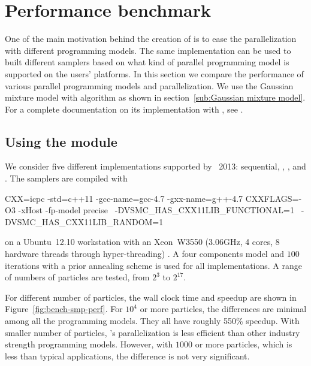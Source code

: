 \section{Performance benchmark}
\label{sec:Performance benchmark}

One of the main motivation behind the creation of \vsmc is to ease the
parallelization with different programming models. The same implementation can
be used to built different samplers based on what kind of parallel programming
model is supported on the users' platforms. In this section we compare the
performance of various \smp parallel programming models and \opencl
parallelization. We use the Gaussian mixture model with \smc[2] algorithm as
shown in section~\ref{sub:Gaussian mixture model}. For a complete
documentation on its implementation with \vsmc, see \cite{software:VSMC}.

\subsection{Using the \protect\smp module}
\label{sub:Using the SMP module}

We consider five different implementations supported by \icpc~2013:
sequential, \tbb, \cilk, \openmp and \cppoo{} . The
samplers are compiled with
\begin{makecode}
CXX=icpc -std=c++11 -gcc-name=gcc-4.7 -gxx-name=g++-4.7
CXXFLAGS=-O3 -xHost -fp-model precise  \
         -DVSMC_HAS_CXX11LIB_FUNCTIONAL=1  \
         -DVSMC_HAS_CXX11LIB_RANDOM=1
\end{makecode}
on a Ubuntu~12.10 workstation with an Xeon~W3550 (3.06GHz, 4 cores, 8 hardware
threads through hyper-threading) \cpu. A four components model and $100$
iterations with a prior annealing scheme is used for all implementations. A
range of numbers of particles are tested, from $2^3$ to $2^{17}$.

For different number of particles, the wall clock time and speedup are shown
in Figure~\ref{fig:bench-smp-perf}. For $10^4$ or more particles, the
differences are minimal among all the programming models. They all have
roughly 550\% speedup. With smaller number of particles, \vsmc's \cppoo
parallelization is less efficient than other industry strength programming
models. However, with $1000$ or more particles, which is less than typical
applications, the difference is not very significant.

